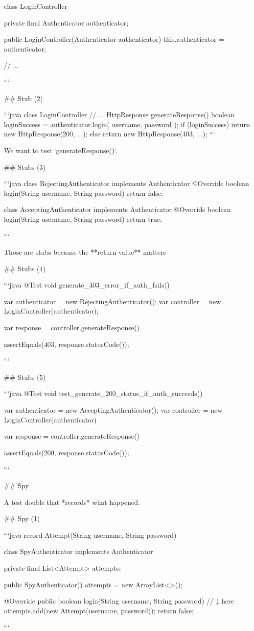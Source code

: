 class LoginController {
  private final Authenticator authenticator;

  public LoginController(Authenticator authenticator) {
    this.authenticator = authenticator;
  }

  // ...
}
```

## Stub (2)

```java
class LoginController {
  // ...
  HttpResponse generateResponse() {
    boolean loginSuccess = authenticator.login(
      username, password
    );
    if (loginSuccess) {
      return new HttpResponse(200, ...);
    } else {
      return new HttpResponse(403, ...);
    }
  }
}
```

We want to test `generateResponse()`.

## Stubs (3)


```java
class RejectingAuthenticator implements Authenticator {
  @Override
  boolean login(String username, String password) {
     return false;
  }
}

class AcceptingAuthenticator implements Authenticator {
  @Override
  boolean login(String username, String password) {
     return true;
  }
}


```

\vfill

Those are stubs because the **return value** matters

## Stubs (4)


```java
@Test
void generate_403_error_if_auth_fails() {
  var authenticator = new RejectingAuthenticator();
  var controller = new LoginController(authenticator);

  var response = controller.generateResponse()

  assertEquals(403, response.statusCode());
}
```

## Stubs (5)

```java
@Test
void test_generate_200_status_if_auth_succeeds() {
  var authenticator = new AcceptingAuthenticator();
  var controller = new LoginController(authenticator)

  var response = controller.generateResponse()

  assertEquals(200, response.statusCode());
}
```


## Spy

A test double that *records* what happened.

## Spy (1)


```java
record Attempt(String username, String password) {}

class SpyAuthenticator implements Authenticator {
  private final List<Attempt> attempts;

  public SpyAuthenticator() {
    attempts = new ArrayList<>();
  }

  @Override
  public boolean login(String username, String password) {
    // ↓ here
    attempts.add(new Attempt(username, password));
    return false;
  }
}
```

